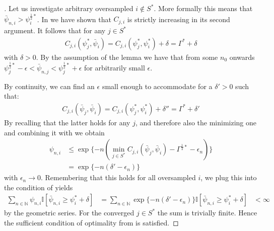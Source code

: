 \begin{proof}[]
  Let us investigate arbitrary oversampled $i \notin S^*$. More formally this
  means that $\bar{\psi}_{n, i} > \psi^{\frac{1}{2}*}_i$. In
   we have shown that $C_{j, i}$ is strictly
  increasing in its second argument. It follows that for any $j \in S^*$
  \begin{align}
    C_{j, i}(\psi_j^*, \bar{\psi}_i) = C_{j, i}(\psi_j^*, \psi_i^*) + \delta = \Gamma^* + \delta
  \end{align}
  with $\delta > 0$. By the assumption of the lemma we have that from
  some $n_0$ onwards $\psi^{\frac{1}{2}*}_j - \epsilon < \bar{\psi}_{n,
  j} < \psi^{\frac{1}{2}*}_j + \epsilon$ for arbitrarily small $\epsilon$.

  By continuity, we can find an $\epsilon$ small enough to accommodate for a $\delta' > 0$ such that:
  \begin{align}
    C_{j, i}(\bar{\psi}_j, \bar{\psi}_i) = C_{j, i}(\psi_j^*, \psi_i^*) + \delta'' = \Gamma^* + \delta'
  \end{align}
  By recalling that the latter holds for any $j$, and therefore also the minimizing one and combining it with  we obtain
  \begin{align}
    \psi_{n, i} &\leq \exp\{-n( \min_{j \in S^*} C_{j, i}(\bar{\psi}_j,
        \bar{\psi}_i) - \Gamma^{\frac{1}{2}*} - \epsilon_n) \}\\
      &= \exp\{-n(\delta' - \epsilon_n)\}
  \end{align}
  with $\epsilon_n \rightarrow 0$. Remembering that this holds for all oversampled $i$, we plug this into the condition of  yields
  \begin{align}
    \sum_{n \in \mathbb{N}} \psi_{n, i}
        \mathbb{I}[\bar{\psi}_{n, i} \geq \psi^*_i + \delta]
      &= \sum_{n \in \mathbb{N}} \exp\{-n(\delta' - \epsilon_n)\}
          \mathbb{I}[\bar{\psi}_{n, i} \geq \psi^*_i + \delta]
      &< \infty
  \end{align}
  by the geometric series. For the converged $j \in S^*$ the sum is trivially finite. Hence the sufficient condition of optimality from  is satisfied.
\end{proof}

